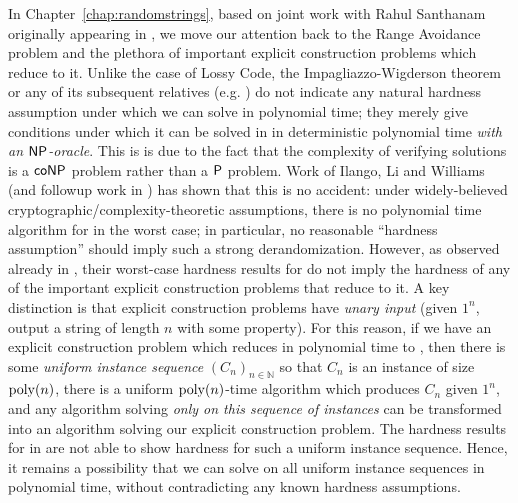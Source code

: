 In Chapter~\ref{chap:randomstrings}, based on joint work with Rahul Santhanam originally appearing in \cite{KortenSanthanam25}, we move our attention back to the Range Avoidance problem and the plethora of important explicit construction problems which reduce to it. Unlike the case of {\sc Lossy Code}, the Impagliazzo-Wigderson theorem or any of its subsequent relatives (e.g. \cite{IW98,AM-derandomization,shaltiel-umans,umans}) do not indicate any natural hardness assumption under which we can solve \avoid in polynomial time; they merely give conditions under which it can be solved in in deterministic polynomial time \emph{with an $\cl{NP}$-oracle}. This is is due to the fact that the complexity of verifying \avoid solutions is a $\cl{coNP}$ problem rather than a $\cl{P}$ problem. Work of Ilango, Li and Williams \cite{ILW23} (and followup work in \cite{CL24, Ilango25ODH,RWZ26}
) has shown that this is no accident: under widely-believed cryptographic/complexity-theoretic assumptions, there is no polynomial time algorithm for \avoid in the worst case; in particular, no reasonable ``hardness assumption'' should imply such a strong derandomization. However, as observed already in \cite{ILW23}, their worst-case hardness results for \avoid do not imply the hardness of any of the important explicit construction problems that reduce to it. A key distinction is that explicit construction problems have \emph{unary input} (given $1^n$, output a string of length $n$ with some property). For this reason, if we have an explicit construction problem which reduces in polynomial time to \avoid, then there is some \emph{uniform instance sequence} $(C_n)_{n \in \mathbb{N}}$ so that $C_n$ is an \avoid instance of size $\mathrm{poly}(n)$, there is a uniform $\mathrm{poly}(n)$-time algorithm which produces $C_n$ given $1^n$, and any algorithm solving \avoid \emph{only on this sequence of instances} can be transformed into an algorithm solving our explicit construction problem. The hardness results for \avoid in \cite{ILW, CL24, Ilango25ODH,RWZ26} are not able to show hardness for such a uniform instance sequence. Hence, it remains a possibility that we can solve \avoid on all uniform instance sequences in polynomial time, without contradicting any known hardness assumptions. 

